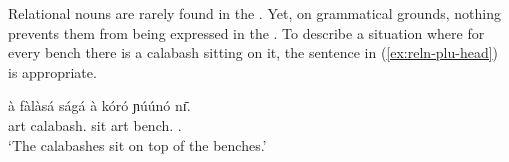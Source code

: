 \begin{exe}
\begin{exe}
\begin{exe}
\begin{exe}
\begin{exe}
\begin{exe}
\begin{exe}
\begin{exe}
% 
% 
% 
% 
% 



Relational nouns are rarely found in the . Yet, on grammatical grounds, nothing prevents them from being expressed in the . To describe a situation where  for every bench there is a calabash sitting on it, the sentence in (\ref{ex:reln-plu-head}) is appropriate.


\ea\label{ex:reln-plu-head}
\gll à fàlàsá ságá à kóró ɲúúnó nɪ̄.\\
{\sc art} calabash.{\pl}  sit {\sc art} bench.{\pl}  {\reln .\pl} {\postp}\\
\glt `The calabashes sit on top of the benches.' 
\z


\end{exe}
\end{exe}
\end{exe}
\end{exe}
\end{exe}
\end{exe}
\end{exe}
\end{exe}
